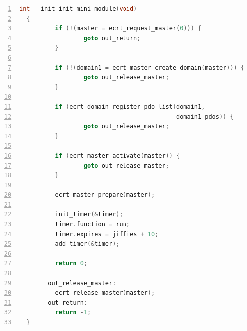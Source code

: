 \documentclass[a4paper,12pt,BCOR6mm,bibtotoc,idxtotoc]{scrbook}
\begin{document}
\begin{lstlisting}[language=C,numbers=left,caption={Minimal init
    function},label={lst:miniinit}]
  int __init init_mini_module(void)
  {
          if (!(master = ecrt_request_master(0))) {
                  goto out_return;
          }

          if (!(domain1 = ecrt_master_create_domain(master))) {
                  goto out_release_master;
          }

          if (ecrt_domain_register_pdo_list(domain1,
                                            domain1_pdos)) {
                  goto out_release_master;
          }

          if (ecrt_master_activate(master)) {
                  goto out_release_master;
          }

          ecrt_master_prepare(master);

          init_timer(&timer);
          timer.function = run;
          timer.expires = jiffies + 10;
          add_timer(&timer);

          return 0;

        out_release_master:
          ecrt_release_master(master);
        out_return:
          return -1;
  }
\end{lstlisting}
\end{document}
